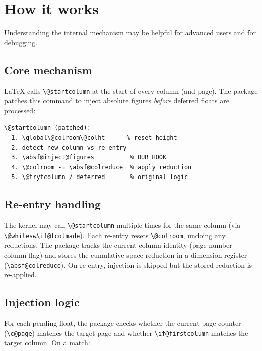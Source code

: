 \documentclass[a4paper]{article}
\newcommand\cmd[1]{\texttt{\string#1}}
\newcommand\meta[1]{\ensuremath{\langle}\textit{#1}\ensuremath{\rangle}}
\begin{document}
\section{How it works}

Understanding the internal mechanism may be helpful for advanced users
and for debugging.

\subsection{Core mechanism}

\LaTeX{} calls \verb|\@startcolumn| at the start of every column (and
page). The package patches this command to inject absolute figures
\emph{before} deferred floats are processed:

\begin{verbatim}
\@startcolumn (patched):
  1. \global\@colroom\@colht      % reset height
  2. detect new column vs re-entry
  3. \absf@inject@figures          % OUR HOOK
  4. \@colroom -= \absf@colreduce  % apply reduction
  5. \@tryfcolumn / deferred       % original logic
\end{verbatim}

\subsection{Re-entry handling}

The kernel may call \verb|\@startcolumn| multiple times for the same
column (via \verb|\@whilesw\if@fcolmade|). Each re-entry resets
\verb|\@colroom|, undoing any reductions. The package tracks the
current column identity (page number + column flag) and stores the
cumulative space reduction in a dimension register
(\verb|\absf@colreduce|). On re-entry, injection is skipped but the
stored reduction is re-applied.

\subsection{Injection logic}

For each pending float, the package checks whether the current
page counter (\verb|\c@page|) matches the target page and whether
\verb|\if@firstcolumn| matches the target column. On a match:

\end{document}
